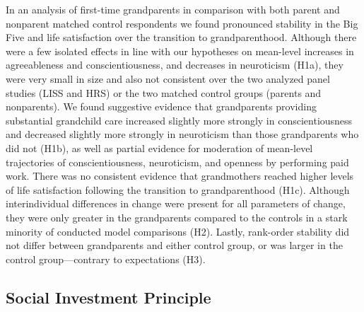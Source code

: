 \documentclass[
  english,
  man, noextraspace]{apa7}
\begin{document}
In an analysis of first-time grandparents in comparison with both parent and nonparent matched control respondents we found pronounced stability in the Big Five and life satisfaction over the transition to grandparenthood. Although there were a few isolated effects in line with our hypotheses on mean-level increases in agreeableness and conscientiousness, and decreases in neuroticism (H1a), they were very small in size and also not consistent over the two analyzed panel studies (LISS and HRS) or the two matched control groups (parents and nonparents). We found suggestive evidence that grandparents providing substantial grandchild care increased slightly more strongly in conscientiousness and decreased slightly more strongly in neuroticism than those grandparents who did not (H1b), as well as partial evidence for moderation of mean-level trajectories of conscientiousness, neuroticism, and openness by performing paid work. There was no consistent evidence that grandmothers reached higher levels of life satisfaction following the transition to grandparenthood (H1c). Although interindividual differences in change were present for all parameters of change, they were only greater in the grandparents compared to the controls in a stark minority of conducted model comparisons (H2). Lastly, rank-order stability did not differ between grandparents and either control group, or was larger in the control group---contrary to expectations (H3).

\hypertarget{social-investment-principle}{%
\subsection{Social Investment Principle}\label{social-investment-principle}}
\end{document}
